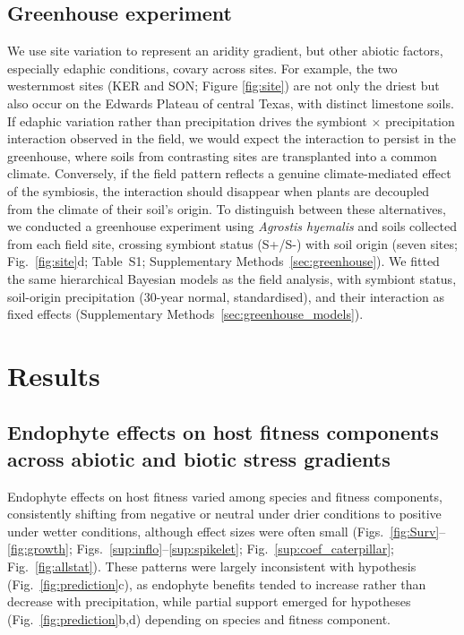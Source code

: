 \documentclass[12pt]{article}\usepackage[]{graphicx}\usepackage[dvipsnames]{xcolor}
\begin{document}
\subsection*{Greenhouse experiment}
We use site variation to represent an aridity gradient, but other abiotic factors, especially edaphic conditions, covary across sites. 
For example, the two westernmost sites (KER and SON; Figure \ref{fig:site}) are not only the driest but also occur on the Edwards Plateau of central Texas, with 
distinct limestone soils.
If edaphic variation rather than precipitation drives the symbiont $\times$ precipitation interaction observed in the field, we would expect the interaction to persist in the greenhouse, where soils 
from contrasting sites are transplanted into a common climate. 
Conversely, if the field pattern reflects a genuine climate-mediated effect of the symbiosis, the interaction should disappear when plants are decoupled from the climate of their soil's origin. To distinguish between these alternatives, we conducted a greenhouse experiment using \textit{Agrostis hyemalis} and soils collected from each field site, crossing symbiont status (S+/S-) with soil origin (seven sites; Fig.~\ref{fig:site}d; 
Table~S1; Supplementary Methods~\ref{sec:greenhouse}).
We fitted the same hierarchical Bayesian models as the field analysis, with symbiont status, soil-origin precipitation (30-year normal, standardised), and their interaction as fixed effects (Supplementary Methods~\ref{sec:greenhouse_models}).

\section*{Results}
\subsection*{Endophyte effects on host fitness components across abiotic and biotic stress gradients}
Endophyte effects on host fitness varied among species and fitness components, consistently shifting from negative or neutral under drier conditions to positive under wetter conditions, although effect sizes were often small (Figs.~\ref{fig:Surv}--\ref{fig:growth}; Figs.~\ref{sup:inflo}--\ref{sup:spikelet}; Fig.~\ref{sup:coef_caterpillar}; Fig.~\ref{fig:allstat}).
These patterns were largely inconsistent with hypothesis (Fig.~\ref{fig:prediction}c), as endophyte benefits tended to increase rather than decrease with precipitation, while partial support emerged for hypotheses (Fig.~\ref{fig:prediction}b,d) depending on species and fitness component.
\end{document}
